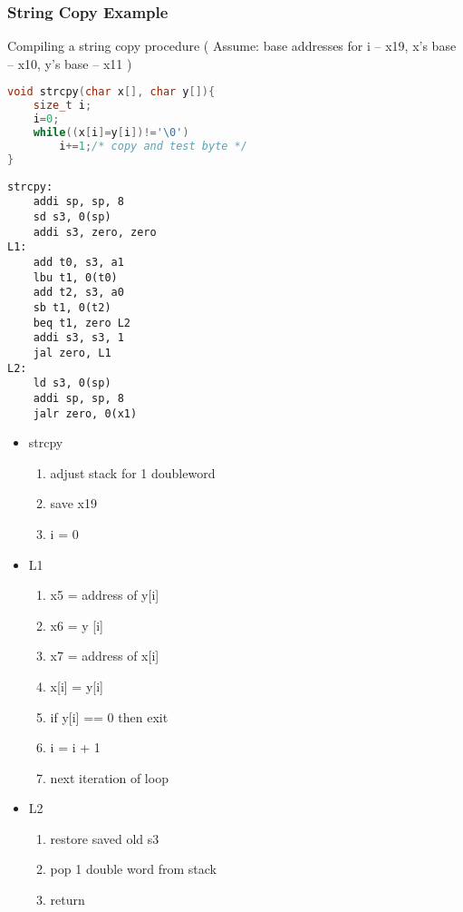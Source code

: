 \subsubsection{String Copy Example}
Compiling a string copy procedure ( Assume: base addresses for i -- x19, x's base -- x10, y's base -- x11 )
\begin{lstlisting}[language={c},title={C code: Y $\rightarrow$ X}]
void strcpy(char x[], char y[]){
    size_t i;
    i=0;
    while((x[i]=y[i])!='\0')
        i+=1;/* copy and test byte */
}
\end{lstlisting}

\begin{lstlisting}[language={[x86masm]Assembler},title={RISC-V assembly code}]
strcpy:
    addi sp, sp, 8
    sd s3, 0(sp)
    addi s3, zero, zero
L1: 
    add t0, s3, a1
    lbu t1, 0(t0)
    add t2, s3, a0
    sb t1, 0(t2)
    beq t1, zero L2
    addi s3, s3, 1
    jal zero, L1
L2:
    ld s3, 0(sp)
    addi sp, sp, 8
    jalr zero, 0(x1)
\end{lstlisting}
\begin{itemize}
    \item strcpy
    \begin{enumerate}
        \item adjust stack for 1 doubleword
        \item save x19
        \item i = 0
    \end{enumerate}
    \item L1
    \begin{enumerate}
        \item x5 = address of y[i]
        \item x6 = y [i]
        \item x7 = address of x[i]
        \item x[i] = y[i]
        \item if y[i] == 0 then exit
        \item i = i + 1
        \item next iteration of loop
    \end{enumerate}
    \item L2
    \begin{enumerate}
        \item restore saved old s3
        \item pop 1 double word from stack
        \item return
    \end{enumerate}
\end{itemize}

